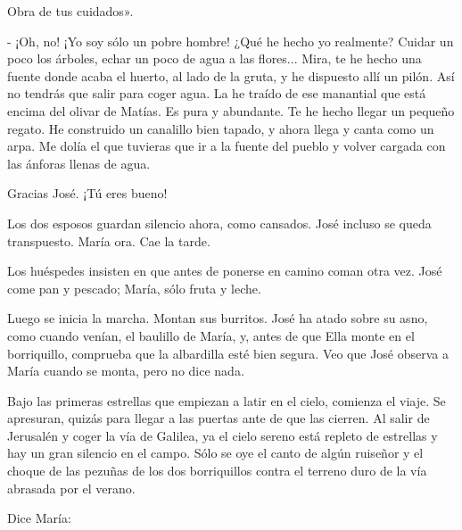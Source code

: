 \documentclass[12pt, twoside, openright]{book} %
\begin{document}
Obra de tus cuidados». 

- ¡Oh, no! ¡Yo soy sólo un pobre hombre! ¿Qué he hecho yo realmente? Cuidar un poco los árboles, echar un poco de agua a las flores... Mira, te he hecho una fuente donde acaba el huerto, al lado de la gruta, y he dispuesto allí un pilón. Así no tendrás que salir para coger agua. La he traído de ese manantial que está encima del olivar de Matías. Es pura y abundante. Te he hecho llegar un pequeño regato. He construido un canalillo bien tapado, y ahora llega y canta como un arpa. Me dolía el que tuvieras que ir a la fuente del pueblo y volver cargada con las ánforas llenas de agua. 

Gracias José. ¡Tú eres bueno! 

Los dos esposos guardan silencio ahora, como cansados. José incluso se queda transpuesto. María ora. Cae la tarde. 

Los huéspedes insisten en que antes de ponerse en camino coman otra vez. José come pan y pescado; María, sólo fruta y leche. 

Luego se inicia la marcha. Montan sus burritos. José ha atado sobre su asno, como cuando venían, el baulillo de María, y, antes de que Ella monte en el borriquillo, comprueba que la albardilla esté bien segura. Veo que José observa a María cuando se monta, pero no dice nada. 

Bajo las primeras estrellas que empiezan a latir en el cielo, comienza el viaje. Se apresuran, quizás para llegar a las puertas ante de que las cierren. Al salir de Jerusalén y coger la vía de Galilea, ya el cielo sereno está repleto de estrellas y hay un gran silencio en el campo. Sólo se oye el canto de algún ruiseñor y el choque de las pezuñas de los dos borriquillos contra el terreno duro de la vía abrasada por el verano. 

Dice María: 
\end{document}
